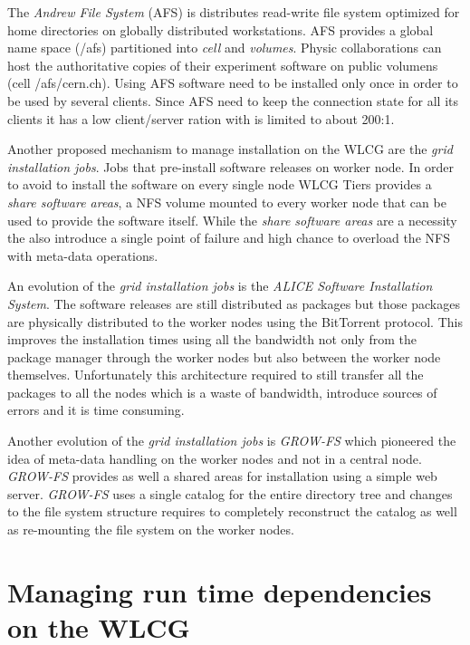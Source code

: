 The \textit{Andrew File System} \cite{andrew} (AFS) is distributes read-write
file system optimized for home directories on globally distributed
workstations. AFS provides a global name space (/afs) partitioned into
\textit{cell} and \textit{volumes}. Physic collaborations can host the
authoritative copies of their experiment software on public volumens (cell
/afs/cern.ch). Using AFS software need to be installed only once in order to be
used by several clients.  Since AFS need to keep the connection state for all
its clients it has a low client/server ration with is limited to about 200:1.

Another proposed mechanism to manage installation on the WLCG are the
\textit{grid installation jobs}. Jobs that pre-install software releases on
worker node. In order to avoid to install the software on every single node
WLCG Tiers provides a \textit{share software areas}, a NFS volume mounted to
every worker node that can be used to provide the software itself. While the
\textit{share software areas} are a necessity the also introduce a single point
of failure and high chance to overload the NFS with meta-data operations.

An evolution of the \textit{grid installation jobs} is the \textit{ALICE
Software Installation System}. The software releases are still distributed as
packages but those packages are physically distributed to the worker nodes
using the BitTorrent protocol. This improves the installation times using all
the bandwidth not only from the package manager through the worker nodes but
also between the worker node themselves. Unfortunately this architecture
required to still transfer all the packages to all the nodes which is a waste
of bandwidth, introduce sources of errors and it is time consuming.

Another evolution of the \textit{grid installation jobs} is \textit{GROW-FS}
\cite{grow-fs} which pioneered the idea of meta-data handling on the worker
nodes and not in a central node. \textit{GROW-FS} provides as well a shared
areas for installation using a simple web server. \textit{GROW-FS} uses a
single catalog for the entire directory tree and changes to the file system
structure requires to completely reconstruct the catalog as well as re-mounting
the file system on the worker nodes.

\section{Managing run time dependencies on the WLCG}

